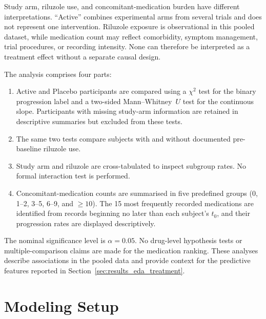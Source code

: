 Study arm, riluzole use, and concomitant-medication burden have different interpretations. ``Active'' combines experimental arms from several trials and does not represent one intervention. Riluzole exposure is observational in this pooled dataset, while medication count may reflect comorbidity, symptom management, trial procedures, or recording intensity. None can therefore be interpreted as a treatment effect without a separate causal design.

The analysis comprises four parts:
\begin{enumerate}
  \item Active and Placebo participants are compared using a $\chi^2$ test for the binary progression label and a two-sided Mann--Whitney~$U$ test for the continuous slope. Participants with missing study-arm information are retained in descriptive summaries but excluded from these tests.
  \item The same two tests compare subjects with and without documented pre-baseline riluzole use.
  \item Study arm and riluzole are cross-tabulated to inspect subgroup rates. No formal interaction test is performed.
  \item Concomitant-medication counts are summarised in five predefined groups (0, 1--2, 3--5, 6--9, and $\geq10$). The 15 most frequently recorded medications are identified from records beginning no later than each subject's $t_0$, and their progression rates are displayed descriptively.
\end{enumerate}
The nominal significance level is $\alpha=0.05$. No drug-level hypothesis tests or multiple-comparison claims are made for the medication ranking. These analyses describe associations in the pooled data and provide context for the predictive features reported in Section~\ref{sec:results_eda_treatment}.

\section{Modeling Setup}
\label{sec:methods_modeling}
